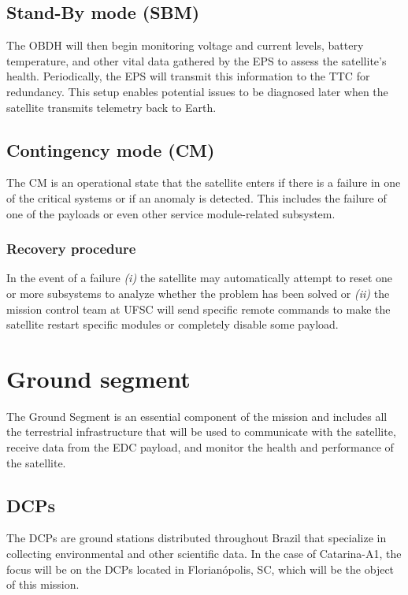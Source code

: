 \subsection{Stand-By mode (SBM)}

The \ac{OBDH} will then begin monitoring voltage and current levels, battery temperature, and other vital data gathered by the \ac{EPS} to assess the satellite's health. Periodically, the \ac{EPS} will transmit this information to the \ac{TTC} for redundancy. This setup enables potential issues to be diagnosed later when the satellite transmits telemetry back to Earth.

\subsection{Contingency mode (CM)}

The \ac{CM} is an operational state that the satellite enters if there is a failure in one of the critical systems or if an anomaly is detected. This includes the failure of one of the payloads or even other service module-related subsystem.

\subsubsection{Recovery procedure}

In the event of a failure \textit{(i)} the satellite may automatically attempt to reset one or more subsystems to analyze whether the problem has been solved or \textit{(ii)} the mission control team at \ac{UFSC} will send specific remote commands to make the satellite restart specific modules or completely disable some payload.

\section{Ground segment}

The Ground Segment is an essential component of the mission and includes all the terrestrial infrastructure that will be used to communicate with the satellite, receive data from the \ac{EDC} payload, and monitor the health and performance of the satellite.

\subsection{\aclp{DCP}}

The \acp{DCP} are ground stations distributed throughout Brazil that specialize in collecting environmental and other scientific data. In the case of Catarina-A1, the focus will be on the \acp{DCP} located in Florianópolis, SC, which will be the object of this mission.

